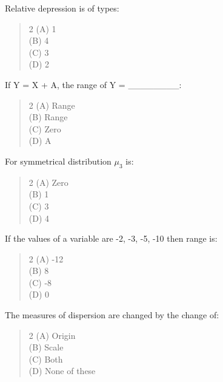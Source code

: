 \documentclass[11pt,a4paper]{article}
\begin{document}
\begin{mcqlist}
\item Relative depression is of types:
\begin{quote}\begin{multicols}{2}
\noindent (A) 1 \\
(B) 4 \\
(C) 3 \\
(D) 2
\end{multicols}\end{quote}

\item If Y = X + A, the range of Y = \_\_\_\_\_\_\_\_:
\begin{quote}\begin{multicols}{2}
\noindent (A) Range \\
(B) Range \\
(C) Zero \\
(D) A
\end{multicols}\end{quote}

\item For symmetrical distribution $\mu_3$ is:
\begin{quote}\begin{multicols}{2}
\noindent (A) Zero \\
(B) 1 \\
(C) 3 \\
(D) 4
\end{multicols}\end{quote}

\item If the values of a variable are -2, -3, -5, -10 then range is:
\begin{quote}\begin{multicols}{2}
\noindent (A) -12 \\
(B) 8 \\
(C) -8 \\
(D) 0
\end{multicols}\end{quote}

\item The measures of dispersion are changed by the change of:
\begin{quote}\begin{multicols}{2}
\noindent (A) Origin \\
(B) Scale \\
(C) Both \\
(D) None of these
\end{multicols}\end{quote}


\end{mcqlist}
\end{document}
